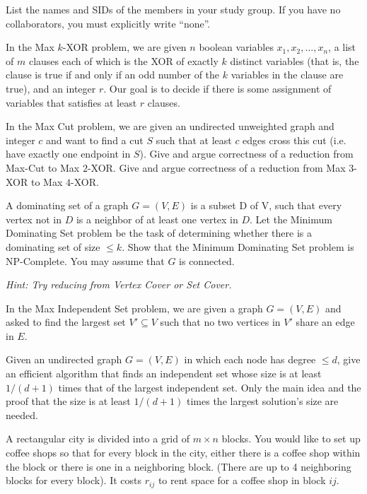 \documentclass{article}
\begin{document}
List the names and SIDs of the members in your study group.
If you have no collaborators, you must explicitly write ``none''.


In the Max $k$-XOR problem, we are given $n$ boolean variables $x_1, x_2, \ldots, x_n$, a list of $m$ clauses each of which is the XOR of exactly $k$ distinct variables (that is, the clause is true if and only if an odd number of the $k$ variables in the clause are true), and an integer $r$. Our goal is to decide if there is some assignment of variables that satisfies at least $r$ clauses.

\begin{subparts}
\subpart In the Max Cut problem, we are given an undirected unweighted graph and integer $c$ and want to find a cut $S$ such that at least $c$ edges cross this cut (i.e. have exactly one endpoint in $S$). Give and argue correctness of a reduction from Max-Cut to Max $2$-XOR.
\subpart Give and argue correctness of a reduction from Max $3$-XOR to Max $4$-XOR.
\end{subparts}



A dominating set of a graph $G = (V, E)$ is a subset D of V, such that
every vertex not in $D$ is a neighbor of at least one vertex in
$D$. Let the Minimum Dominating Set problem be the task of determining
whether there is a dominating set of size $\leq k$. Show that the Minimum Dominating Set problem is NP-Complete. You may
assume that $G$ is connected.

\textit{Hint: Try reducing from Vertex Cover or Set Cover.}


In the Max Independent Set problem, we are given a graph $G=(V,E)$ and asked to find the largest set $V' \subseteq V$ such that no two vertices in $V'$ share an edge in $E$.

Given an undirected graph $G=(V,E)$ in which each node has degree $\le d$, give an efficient algorithm that finds an independent set whose size is at least $1/(d + 1)$
times that of the largest independent set. Only the main idea and the proof that the
size is at least $1/(d+1)$ times the largest solution's size are needed.


A rectangular city is divided into a grid of $m \times n$ blocks.  You
would like to set up coffee shops so that for every block in the city,
either there is a coffee shop within the block or there is one in a
neighboring block.  (There are up to 4 neighboring blocks for every
block). It costs $r_{ij}$ to rent space for a coffee shop in block $ij$.  
\end{document}
